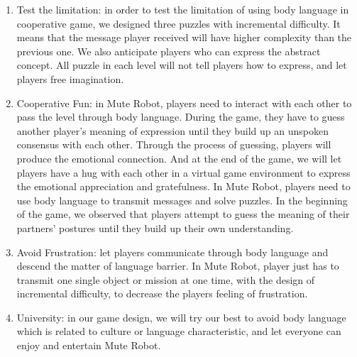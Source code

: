 \documentclass{sigchi}
\begin{document}
\begin{enumerate}
\item Test the limitation: in order to test the limitation of using body language in cooperative game, we designed three puzzles with incremental difficulty. It means that the message player received will have higher complexity than the previous one.
We also anticipate players who can express the abstract concept. All puzzle in each level will not tell players how to express, and let players free imagination.
\item Cooperative Fun: 
in Mute Robot, players need to interact with each other to pass the level through body language. During the game, they have to guess another player's meaning of expression until they build up an unspoken consensus with each other. Through the process of guessing, players will produce the emotional connection. And at the end of the game, we will let players have a hug with each other in a virtual game environment to express the emotional appreciation and gratefulness.
In Mute Robot, players need to use body language to transmit messages and solve puzzles. In the beginning of the game, we observed that players attempt to guess the meaning of their partners’ postures until they build up their own understanding. 
\item Avoid Frustration: 
let players communicate through body language and descend the matter of language barrier. In Mute Robot, player just has to transmit one single object or mission at one time, with the design of incremental difficulty, to decrease the players feeling of frustration.
\item University: 
in our game design, we will try our best to avoid body language which is related to culture or language characteristic, and let everyone can enjoy and entertain Mute Robot.
\end{enumerate}
\end{document}
